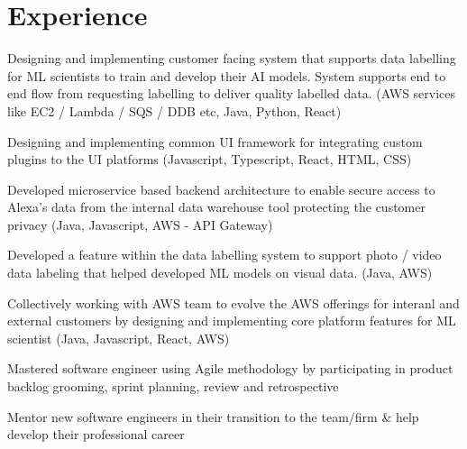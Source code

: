\documentclass[]{main}
\begin{document}
\hfill
\begin{minipage}[t]{0.73\textwidth} 


\section{Experience}


\vspace{\topsep} %
\begin{tightemize}
\item Designing and implementing customer facing system that supports data labelling for ML scientists to train and develop their AI models. System supports end to end flow from requesting labelling to deliver quality labelled data. (AWS services like EC2 / Lambda / SQS / DDB etc, Java, Python, React)
\item Designing and implementing common UI framework for integrating custom plugins to the UI platforms (Javascript, Typescript, React, HTML, CSS)
\item Developed microservice based backend architecture to enable secure access to Alexa's data from the internal data warehouse tool protecting the customer privacy (Java, Javascript, AWS - API Gateway)
\item Developed a feature within the data labelling system to support photo / video data labeling that helped developed ML models on visual data. (Java, AWS)
\item Collectively working with AWS team to evolve the AWS offerings for interanl and external customers by designing and implementing core platform features for ML scientist (Java, Javascript, React, AWS)
\item Mastered software engineer using Agile methodology by participating in product backlog
grooming, sprint planning, review and retrospective
\item Mentor new software engineers in their transition to the team/firm \& help develop their professional career
\end{tightemize}
\sectionsep




\end{minipage}
\end{document}
